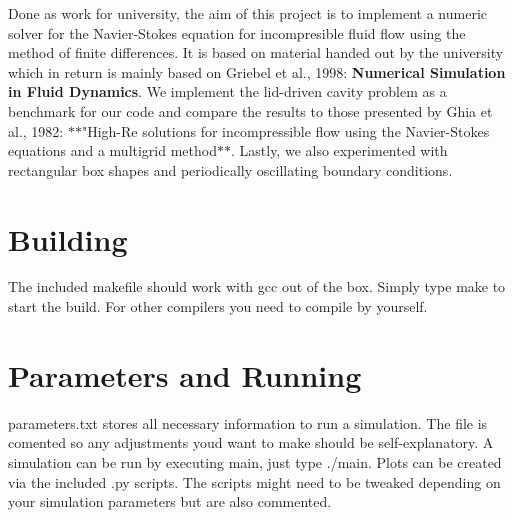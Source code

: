Done as work for university, the aim of this project is to implement a numeric solver for the Navier-\/\+Stokes equation for incompresible fluid flow using the method of finite differences. It is based on material handed out by the university which in return is mainly based on Griebel et al., 1998\+: {\bfseries Numerical Simulation in Fluid Dynamics}. We implement the lid-\/driven cavity problem as a benchmark for our code and compare the results to those presented by Ghia et al., 1982\+: $\ast$$\ast$"High-\/\+Re solutions for incompressible flow using the Navier-\/\+Stokes equations and a multigrid method$\ast$$\ast$. Lastly, we also experimented with rectangular box shapes and periodically oscillating boundary conditions.

 

 

 

\section*{Building}

The included makefile should work with gcc out of the box. Simply type {\ttfamily make} to start the build. For other compilers you need to compile by yourself.

\section*{Parameters and Running}

{\ttfamily parameters.\+txt} stores all necessary information to run a simulation. The file is comented so any adjustments you\textquotesingle{}d want to make should be self-\/explanatory. A simulation can be run by executing {\ttfamily main}, just type {\ttfamily ./main}. Plots can be created via the included {\ttfamily .py} scripts. The scripts might need to be tweaked depending on your simulation parameters but are also commented. 